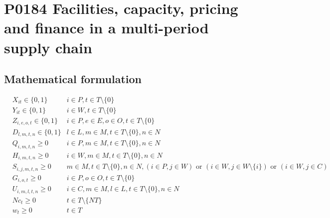 \documentclass[10pt]{article}
\begin{document}
\section*{P0184 Facilities, capacity, pricing and finance in a multi-period supply chain}
\subsection*{Mathematical formulation}
\[
\begin{aligned}
& X_{it} \in \{0,1\} & i \in P, t \in T \setminus \{0\} \\
& Y_{it} \in \{0,1\} & i \in W, t \in T \setminus \{0\} \\
& Z_{i,e,o,t} \in \{0,1\} & i \in P, e \in E, o \in O, t \in T \setminus \{0\} \\
& D_{l,m,t,n} \in \{0,1\} & l \in L, m \in M, t \in T \setminus \{0\}, n \in N \\
& Q_{i,m,t,n} \ge 0 & i \in P, m \in M, t \in T \setminus \{0\}, n \in N \\
& H_{i,m,t,n} \ge 0 & i \in W, m \in M, t \in T \setminus \{0\}, n \in N \\
& S_{i,j,m,t,n} \ge 0 & m \in M, t \in T \setminus \{0\}, n \in N, (i \in P, j \in W) \text{ or } (i \in W, j \in W \setminus \{i\}) \text{ or } (i \in W, j \in C) \\
& G_{i,o,t} \ge 0 & i \in P, o \in O, t \in T \setminus \{0\} \\
& U_{i,m,l,t,n} \ge 0 & i \in C, m \in M, l \in L, t \in T \setminus \{0\}, n \in N \\
& Nc_t \ge 0 & t \in T \setminus \{NT\} \\
& w_t \ge 0 & t \in T
\end{aligned}
\]
\end{document}
